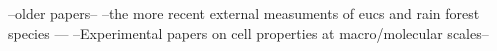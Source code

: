 --older papers-- \cite{Chauhan_2010} \cite{Entwistle_2014}
--the more recent external measuments of eucs and rain forest species ---
--Experimental papers on cell properties at macro/molecular scales--